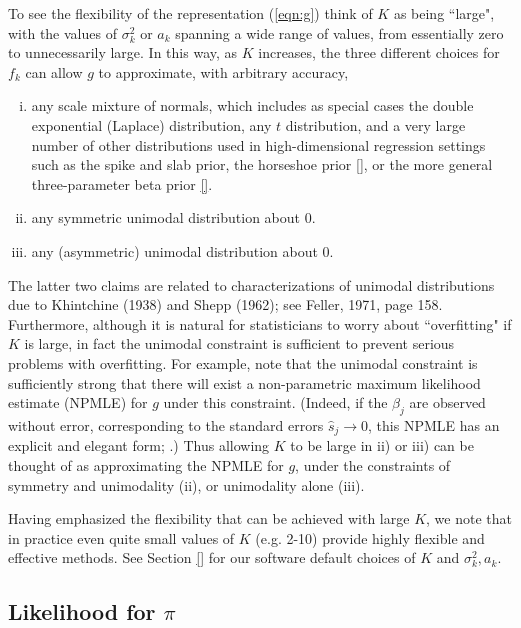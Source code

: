 \documentclass[11pt]{article}
\def\shat{\hat{s}}
\begin{document}
To see the flexibility of the representation (\ref{eqn:g})
think of $K$ as being ``large", with the values of $\sigma^2_k$ or $a_k$ 
spanning a wide range of values, from
essentially zero to unnecessarily large. In this way, as $K$ increases, the three different choices for $f_k$ can allow $g$ to approximate,
with arbitrary accuracy,
\begin{enumerate}[i)]
\item any scale mixture of normals, which includes as special cases
the double exponential (Laplace) distribution, any $t$ distribution, and a very large number of other distributions used in 
high-dimensional regression settings such as the spike and slab prior, the horseshoe prior \ref{}, or the more general three-parameter beta prior \ref{}.
\item any symmetric unimodal distribution about 0.
\item any (asymmetric) unimodal distribution about 0.
\end{enumerate}
The latter two claims are related to characterizations of unimodal distributions due to Khintchine (1938) and  Shepp (1962); see Feller, 1971, page  158. 
Furthermore, although it is natural for statisticians to worry about ``overfitting" if $K$ is large, 
in fact the unimodal constraint is sufficient to prevent serious problems with overfitting. For example, note that the unimodal
constraint is sufficiently strong that there will exist a non-parametric
maximum likelihood estimate (NPMLE) for $g$ under this constraint. (Indeed, if the $\beta_j$ are observed without error, corresponding to the standard errors $\shat_j \rightarrow 0$, this NPMLE has an explicit and elegant form; \cite{grenander1956theory}.)
Thus allowing $K$ to be large in ii) or iii) can be thought of as approximating the NPMLE for $g$, under the constraints of symmetry and unimodality (ii), or unimodality alone (iii). 

Having emphasized the flexibility that can be achieved with large $K$, we note that in practice even quite small values of $K$ (e.g. 2-10) provide highly flexible
and effective methods. See Section \ref{} for our software default choices of $K$ and $\sigma^2_k,a_k$.


\subsection*{Likelihood for $\pi$}
\end{document}
